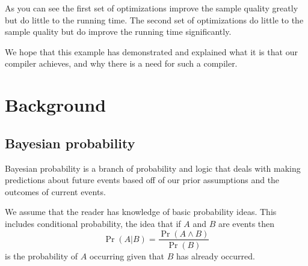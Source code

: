 \documentclass[a4paper]{article}
\begin{document}
As you can see the first set of optimizations improve the sample quality greatly but do little to the running time. The second set of optimizations do little to the sample quality but do improve the running time significantly.

We hope that this example has demonstrated and explained what it is that our compiler achieves, and why there is a need for such a compiler.




\section{Background}




\subsection{Bayesian probability}

Bayesian probability is a branch of probability and logic that deals with making predictions about future events based off of our prior assumptions and the outcomes of current events.

We assume that the reader has knowledge of basic probability ideas. This includes conditional probability, the idea that if \(A\) and \(B\) are events then
\[\Pr(A | B) = \frac{\Pr(A \land B)}{\Pr(B)}\]
is the probability of \(A\) occurring given that \(B\) has already occurred.
\end{document}
